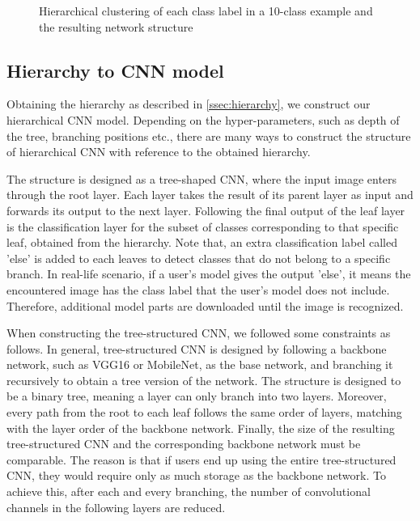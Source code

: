 \begin{figure}
\begin{minipage}[b]{.4\textwidth}
        \label{fig:sub2}
    \end{minipage}
    \caption{Hierarchical clustering of each class label in a 10-class example and the resulting network structure}
    \label{fig:hierarchy}
\end{figure}

\subsection{Hierarchy to CNN model}

Obtaining the hierarchy as described in \ref{ssec:hierarchy}, we construct our hierarchical CNN model. Depending on the hyper-parameters, such as depth of the tree, branching positions etc., there are many ways to construct the structure of hierarchical CNN with reference to the obtained hierarchy.

The structure is designed as a tree-shaped CNN, where the input image enters through the root layer.
Each layer takes the result of its parent layer as input and forwards its output to the next layer. 
Following the final output of the leaf layer is the classification layer for the subset of classes corresponding to that specific leaf, obtained from the hierarchy.
Note that, an extra classification label called 'else' is added to each leaves to detect classes that do not belong to a specific branch.
In real-life scenario, if a user's model gives the output 'else', it means the encountered image has the class label that the user's model does not include.  
Therefore, additional model parts are downloaded until the image is recognized.

When constructing the tree-structured CNN, we followed some constraints as follows. 
In general, tree-structured CNN is designed by following a backbone network, such as VGG16 or MobileNet, as the base network, and branching it recursively to obtain a tree version of the network.
The structure is designed to be a binary tree, meaning a layer can only branch into two layers. 
Moreover, every path from the root to each leaf follows the same order of layers, matching with the layer order of the backbone network.
Finally, the size of the resulting tree-structured CNN and the corresponding backbone network must be comparable. 
The reason is that if users end up using the entire tree-structured CNN, they would require only as much storage as the backbone network.
To achieve this, after each and every branching, the number of convolutional channels in the following layers are reduced.

